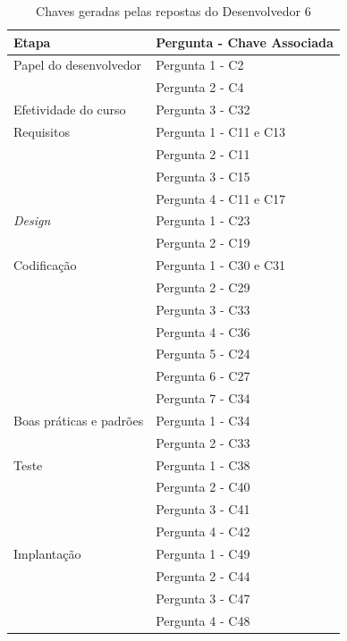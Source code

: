 \begin{table}[h]
	\centering
	\begin{tabular}{|m{4.8cm} | m{4.8cm} |}
		\hline
		\textbf{Etapa} & \textbf{Pergunta - Chave Associada} \\ \hline
		Papel do desenvolvedor & Pergunta 1 - C2 \\ \cline{2-2}
		& Pergunta 2 - C4 \\ \cline{2-2}
		\hline
		Efetividade do curso & Pergunta 3 - C32  \\ \cline{2-2}
		\hline
		Requisitos & Pergunta 1 - C11 e C13 \\ \cline{2-2}
		 & Pergunta 2 - C11 \\ \cline{2-2}
		& Pergunta 3 - C15 \\ \cline{2-2}
		& Pergunta 4 - C11 e C17 \\ \cline{2-2}
		\hline
		\textit{Design} & Pergunta 1 - C23 \\ \cline{2-2}
		& Pergunta 2 - C19 \\ \cline{2-2}
		\hline
		Codificação & Pergunta 1 - C30 e C31 \\ \cline{2-2}
		& Pergunta 2 - C29 \\ \cline{2-2}
		& Pergunta 3 - C33 \\ \cline{2-2}
		& Pergunta 4 - C36 \\ \cline{2-2}
		& Pergunta 5 - C24 \\ \cline{2-2}
		& Pergunta 6 - C27 \\ \cline{2-2}
		& Pergunta 7 - C34 \\ \cline{2-2} \hline
		Boas práticas e padrões & Pergunta 1 - C34 \\ \cline{2-2}
		& Pergunta 2 - C33 \\ \cline{2-2}
		\hline
		Teste & Pergunta 1 - C38 \\ \cline{2-2}
		& Pergunta 2 - C40 \\ \cline{2-2}
		& Pergunta 3 - C41 \\ \cline{2-2}
		& Pergunta 4 - C42 \\ \cline{2-2}
		\hline
		Implantação & Pergunta 1 - C49 \\ \cline{2-2}
		& Pergunta 2 - C44 \\ \cline{2-2}
		& Pergunta 3 - C47 \\ \cline{2-2}
		& Pergunta 4 - C48 \\ \cline{2-2}
		\hline
	\end{tabular}

	\caption{Chaves geradas pelas repostas do Desenvolvedor 6}
	\label{tab07}
\end{table}

